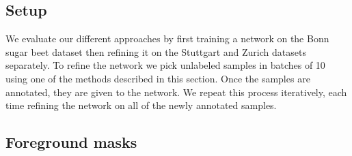 \documentclass[letterpaper, 10 pt, conference]{ieeeconf}  %
\begin{document}
%
%
%
%
%


\subsection{Setup}

We evaluate our different approaches by first training a network on the Bonn sugar beet dataset then refining it on the Stuttgart and Zurich datasets separately. To refine the network we pick unlabeled samples in batches of 10 using one of the methods described in this section. Once the samples are annotated, they are given to the network. We repeat this process iteratively, each time refining the network on all of the newly annotated samples. 



\subsection{Foreground masks}
\end{document}
